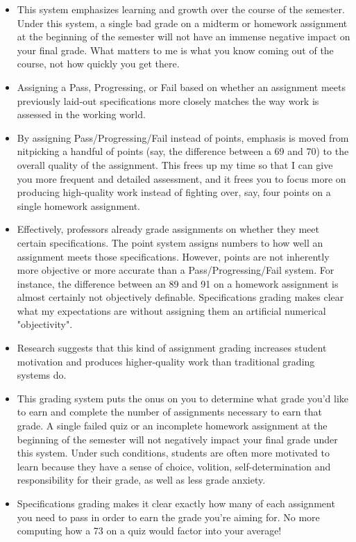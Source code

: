 \documentclass[11pt, a4paper]{article}
\begin{document}
\begin{itemize}

\item This system emphasizes learning and growth over the course of the semester. Under this system, a single bad grade on a midterm or homework assignment at the beginning of the semester will not have an immense negative impact on your final grade. What matters to me is what you know coming out of the course, not how quickly you get there. 
\item Assigning a Pass, Progressing, or Fail based on whether an assignment meets previously laid-out specifications more closely matches the way work is assessed in the working world.
\item By assigning Pass/Progressing/Fail instead of points, emphasis is moved from nitpicking a handful of points (say, the difference between a 69 and 70) to the overall quality of the assignment. This frees up my time so that I can give you more frequent and detailed assessment, and it frees you to focus more on producing high-quality work instead of fighting over, say, four points on a single homework assignment.
\item Effectively, professors already grade assignments on whether they meet certain specifications. The point system assigns numbers to how well an assignment meets those specifications. However, points are not inherently more objective or more accurate than a Pass/Progressing/Fail system. For instance, the difference between an 89 and 91 on a homework assignment is almost certainly not objectively definable. Specifications grading makes clear what my expectations are without assigning them an artificial numerical "objectivity".
\item Research suggests that this kind of assignment grading increases student motivation and produces higher-quality work than traditional grading systems do.
\item This grading system puts the onus on you to determine what grade you'd like to earn and complete the number of assignments necessary to earn that grade. A single failed quiz or an incomplete homework assignment at the beginning of the semester will not negatively impact your final grade under this system. Under such conditions, students are often more motivated to learn because they have a sense of choice, volition, self-determination and responsibility for their grade, as well as less grade anxiety.
\item Specifications grading makes it clear exactly how many of each assignment you need to pass in order to earn the grade you're aiming for. No more computing how a 73 on a quiz would factor into your average!

\end{itemize}
\end{document}
